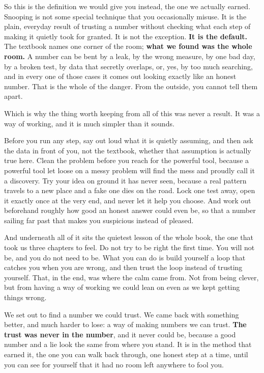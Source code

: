 \documentclass[11pt]{article} %
\begin{document}
So this is the definition we would give you instead, the one we actually earned. Snooping is not some special technique that you occasionally misuse. It is the plain, everyday result of trusting a number without checking what each step of making it quietly took for granted. It is not the exception. \textbf{It is the default.} The textbook names one corner of the room; \textbf{what we found was the whole room.} A number can be bent by a leak, by the wrong measure, by one bad day, by a broken test, by data that secretly overlaps, or, yes, by too much searching, and in every one of those cases it comes out looking exactly like an honest number. That is the whole of the danger. From the outside, you cannot tell them apart.

Which is why the thing worth keeping from all of this was never a result. It was a way of working, and it is much simpler than it sounds.

Before you run any step, say out loud what it is quietly assuming, and then ask the data in front of you, not the textbook, whether that assumption is actually true here. Clean the problem before you reach for the powerful tool, because a powerful tool let loose on a messy problem will find the mess and proudly call it a discovery. Try your idea on ground it has never seen, because a real pattern travels to a new place and a fake one dies on the road. Lock one test away, open it exactly once at the very end, and never let it help you choose. And work out beforehand roughly how good an honest answer could even be, so that a number sailing far past that makes you suspicious instead of pleased.

And underneath all of it sits the quietest lesson of the whole book, the one that took us three chapters to feel. Do not try to be right the first time. You will not be, and you do not need to be. What you can do is build yourself a loop that catches you when you are wrong, and then trust the loop instead of trusting yourself. That, in the end, was where the calm came from. Not from being clever, but from having a way of working we could lean on even as we kept getting things wrong.

We set out to find a number we could trust. We came back with something better, and much harder to lose: a way of making numbers we can trust. \textbf{The trust was never in the number}, and it never could be, because a good number and a lie look the same from where you stand. It is in the method that earned it, the one you can walk back through, one honest step at a time, until you can see for yourself that it had no room left anywhere to fool you.
\end{document}
